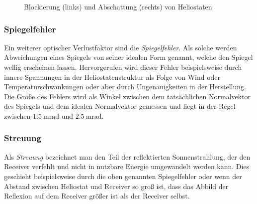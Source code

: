 \begin{figure}[h!]
    \centering
    \setlength{\fboxsep}{1pt}
    \setlength{\fboxrule}{1pt}
\caption[Blockierung und Abschattung von Heliostaten]{Blockierung (links) und Abschattung (rechts) von Heliostaten \cite[S.15]{DissBelhomme}}
    \label{fig_AbschattungBlockieren}
\end{figure}

\subsubsection*{Spiegelfehler} \label{subsubsec_Spiegelfehler}
Ein weiterer optischer Verlustfaktor sind die \textit{Spiegelfehler}.
Als solche werden Abweichungen eines Spiegels von seiner idealen Form genannt, welche den Spiegel wellig erscheinen lassen.
Hervorgerufen wird dieser Fehler beispielsweise durch innere Spannungen in der Heliostatenstruktur als Folge von Wind oder Temperaturschwankungen oder aber durch Ungenauigkeiten in der Herstellung.
Die Größe des Fehlers wird als Winkel zwischen dem tatsächlichen Normalvektor des Spiegels und dem idealen Normalvektor gemessen und liegt in der Regel zwischen $\SI{1.5}{\milli\radian}$ und $\SI{2.5}{\milli\radian}$. \cite[S.16]{DissBelhomme}

\subsubsection*{Streuung} \label{subsubsec_Streuung}
Als \textit{Streuung} bezeichnet man den Teil der reflektierten Sonnenstrahlung, der den Receiver verfehlt und nicht in nutzbare Energie umgewandelt werden kann.
Dies geschieht beispielsweise durch die oben genannten Spiegelfehler oder wenn der Abstand zwischen Heliostat und Receiver so groß ist, dass das Abbild der Reflexion auf dem Receiver größer ist als der Receiver selbst. \cite[S.15-16]{DissBelhomme}

